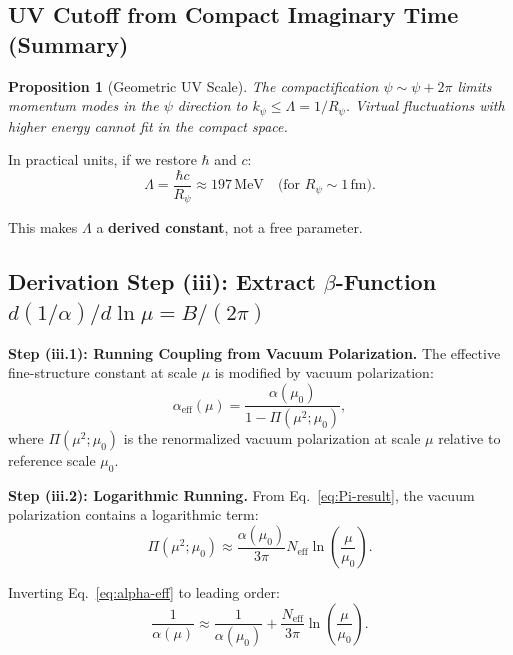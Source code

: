 \documentclass[11pt,a4paper]{article}
\newtheorem{proposition}{Proposition}
\theoremstyle{remark}
\begin{document}
\subsection{UV Cutoff from Compact Imaginary Time (Summary)}

\begin{proposition}[Geometric UV Scale]
The compactification $\psi \sim \psi + 2\pi$ limits momentum modes in the $\psi$ direction to $k_\psi \leq \Lambda = 1/R_\psi$. Virtual fluctuations with higher energy cannot fit in the compact space.
\end{proposition}

In practical units, if we restore $\hbar$ and $c$:
\begin{equation}
\Lambda = \frac{\hbar c}{R_\psi} \approx 197 \, \text{MeV} \quad \text{(for } R_\psi \sim 1 \, \text{fm)}.
\label{eq:cutoff-physical}
\end{equation}

This makes $\Lambda$ a \textbf{derived constant}, not a free parameter.

\subsection{Derivation Step (iii): Extract $\beta$-Function $d(1/\alpha)/d \ln \mu = B/(2\pi)$}

\textbf{Step (iii.1): Running Coupling from Vacuum Polarization.} The effective fine-structure constant at scale $\mu$ is modified by vacuum polarization:
\begin{equation}
\alpha_{\text{eff}}(\mu) = \frac{\alpha(\mu_0)}{1 - \Pi(\mu^2; \mu_0)},
\label{eq:alpha-eff}
\end{equation}
where $\Pi(\mu^2; \mu_0)$ is the renormalized vacuum polarization at scale $\mu$ relative to reference scale $\mu_0$.

\textbf{Step (iii.2): Logarithmic Running.} From Eq.~\eqref{eq:Pi-result}, the vacuum polarization contains a logarithmic term:
\begin{equation}
\Pi(\mu^2; \mu_0) \approx \frac{\alpha(\mu_0)}{3\pi} N_{\text{eff}} \ln\left(\frac{\mu}{\mu_0}\right).
\label{eq:Pi-log}
\end{equation}

Inverting Eq.~\eqref{eq:alpha-eff} to leading order:
\begin{equation}
\frac{1}{\alpha(\mu)} \approx \frac{1}{\alpha(\mu_0)} + \frac{N_{\text{eff}}}{3\pi} \ln\left(\frac{\mu}{\mu_0}\right).
\label{eq:alpha-inverse-running-simple}
\end{equation}
\end{document}
